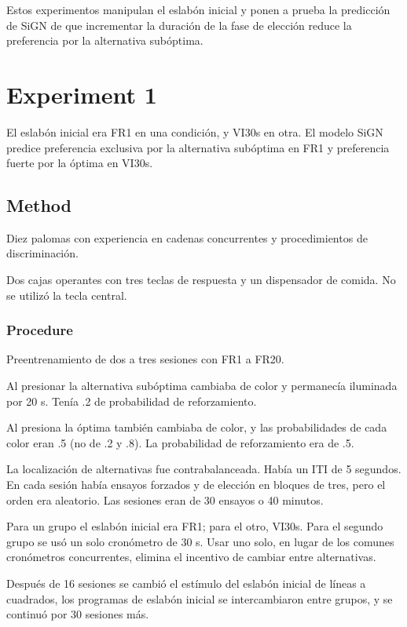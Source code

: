 \documentclass[a4paper,12pt]{article}
\begin{document}
Estos experimentos manipulan el eslabón inicial y ponen a prueba la predicción de SiGN de que incrementar la duración de la fase de elección reduce la preferencia por la alternativa subóptima.

\section{Experiment 1}

El eslabón inicial era FR1 en una condición, y VI30s en otra.
El modelo SiGN predice preferencia exclusiva por la alternativa subóptima en FR1 y preferencia fuerte por la óptima en VI30s.

\subsection{Method}

Diez palomas con experiencia en cadenas concurrentes y procedimientos de discriminación.

Dos cajas operantes con tres teclas de respuesta y un dispensador de comida.
No se utilizó la tecla central.

\subsubsection{Procedure}

Preentrenamiento de dos a tres sesiones con FR1 a FR20.

Al presionar la alternativa subóptima cambiaba de color y permanecía iluminada por 20 s.
Tenía .2 de probabilidad de reforzamiento.

Al presiona la óptima también cambiaba de color, y las probabilidades de cada color eran .5 (no de .2 y .8).
La probabilidad de reforzamiento era de .5.

La localización de alternativas fue contrabalanceada.
Había un ITI de 5 segundos.
En cada sesión había ensayos forzados y de elección en bloques de tres, pero el orden era aleatorio.
Las sesiones eran de 30 ensayos o 40 minutos.

Para un grupo el eslabón inicial era FR1; para el otro, VI30s.
Para el segundo grupo se usó un solo cronómetro de 30 s.
Usar uno solo, en lugar de los comunes cronómetros concurrentes, elimina el incentivo de cambiar entre alternativas.

Después de 16 sesiones se cambió el estímulo del eslabón inicial de líneas a cuadrados, los programas de eslabón inicial se intercambiaron entre grupos, y se continuó por 30 sesiones más.
\end{document}
